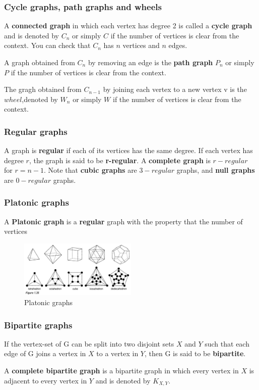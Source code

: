 \documentclass[12pt,a4paper]{ctexart}
\begin{document}
\subsubsection{Cycle graphs, path graphs and wheels}
A \textbf{connected graph} in which each vertex has degree 2 is called a \textbf{cycle graph} 
and is denoted by $C_n$ or simply $C$ if the number of vertices is clear from the context.
You can check that $C_n$ has $n$ vertices and $n$ edges.
\par
A graph obtained from $C_n$ by removing an edge is the \textbf{path graph} $P_n$ or 
simply $P$ if the number of vertices is clear from the context.
\par
The gragh obtained from $C_{n-1}$ by joining each vertex to a new vertex v is the $wheel$,denoted by $W_n$ or simply $W$ if the number of vertices is clear from the context.

\subsubsection{Regular graphs}
A graph is \textbf{regular} if each of its vertices has the same degree. 
If each vertex has degree $r$, the graph is said to be \textbf{r-regular}. 
A \textbf{complete graph} is $r-regular$ for $r=n-1$.
Note that \textbf{cubic graphs} are $3-regular$ graphs, and \textbf{null graphs} are $0-regular$ graphs.

\subsubsection{Platonic graphs}
A \textbf{Platonic graph} is a \textbf{regular} graph with the property that the number of vertices
\begin{figure}[H]
    \centering
    \includegraphics[width=0.5\textwidth]{images/Platonic.png}
    \caption{Platonic graphs}
    \label{fig:platonic}
\end{figure}


\subsubsection{Bipartite graphs}
If the vertex-set of G can be split into two disjoint sets $X$ and $Y$ 
such that each edge of G joins a vertex in $X$ to a vertex in $Y$, 
then G is said to be \textbf{bipartite}.
\par
A \textbf{complete bipartite graph} is a bipartite graph in which every vertex in $X$ is adjacent to every vertex in $Y$ and is denoted by $K_{X,Y}$.
\end{document}
